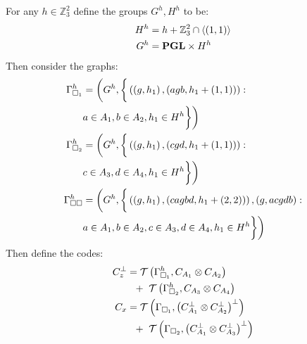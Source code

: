 \documentclass{article}
\begin{document}
\begin{multicols*}{2}
  For any $h \in \mathbb{Z}_{3}^{2} $ define the groups $G^{h}, H^{h}$ to be: 
  \begin{equation*}
    \begin{split}
      H^{h} &=  h + \mathbb{Z}_{3}^{2}\cap \braket{ \left( 1,1 \right)} \\
      G^{h} &=  \mathbf{PGL}  \times H^{h} 
    	\end{split}
\end{equation*} 
  Then consider the graphs:   
  \begin{equation*}
    \begin{split}
      \Gamma_{\square_{1}}^{h} &= \bigg( G^{h}, \bigg{\{} \left( \left(g, h_{1} \right),\left(  agb,h_{1} + \left( 1,1 \right)  \right)\right) :  \\ 
      &  a \in A_{1}, b \in A_{2}, h_{1} \in H^{h}  \bigg{\}}  \bigg) \\
      \Gamma_{\square_{2}}^{h} &= \bigg( G^{h}, \bigg{\{} \left( \left(g, h_{1} \right),\left(  cgd,h_{1} + \left( 1,1 \right)  \right)\right) :  \\ 
      &  c \in A_{3}, d \in A_{4}, h_{1} \in H^{h}  \bigg{\}}  \bigg) \\
      \Gamma_{\square \square}^{h} &= \bigg( G^{h}, \bigg{\{} \left(\left(g, h_{1} \right),\left(  cagbd, h_{1} + \left( 2,2 \right)  \right)\right), \left( g, acgdb \right) :\\
      & a \in A_{1}, b \in A_{2}, c \in A_{3}, d \in A_{4}, h_{1}\in H^{h} \bigg{\}}  \bigg) 
    \end{split}
  \end{equation*}
   Then define the codes:
	\begin{equation*}
	  \begin{split}
	    C_{z}^{\perp} & = \mathcal{T}\left( \Gsah,  \Aab  \right) \\
	    & \ \ + \ \mathcal{T}\left(  \Gsbh, \Acd \right) \\
	    C_{x} &=  \mathcal{T}\left(  \Gamma_{\square_{1}}, \left(  C_{A_1}^{\perp} \otimes C_{A_2}^{\perp} \right)^{\perp}  \right) \\
	    & \ \ + \ \mathcal{T}\left( \Gamma_{\square_{2}}, \left(  C_{A_1}^{\perp} \otimes C_{A_3}^{\perp} \right)^{\perp}  \right) \\

\end{split}
\end{equation*}
\end{multicols*}
\end{document}
